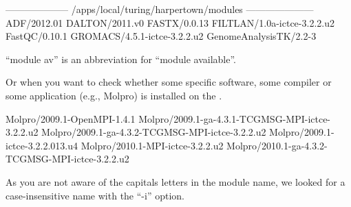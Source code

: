 \begin{prompt}
-------------------- /apps/local/turing/harpertown/modules ---------------------
ADF/2012.01
DALTON/2011.v0
FASTX/0.0.13
FILTLAN/1.0a-ictce-3.2.2.u2
FastQC/0.10.1
GROMACS/4.5.1-ictce-3.2.2.u2
GenomeAnalysisTK/2.2-3
\end{prompt}

``module av'' is an abbreviation for ``module available''.

Or when you want to check whether some specific software, some compiler or some
application (e.g., Molpro) is installed on the \hpc.

\begin{prompt}
Molpro/2009.1-OpenMPI-1.4.1
Molpro/2009.1-ga-4.3.1-TCGMSG-MPI-ictce-3.2.2.u2
Molpro/2009.1-ga-4.3.2-TCGMSG-MPI-ictce-3.2.2.u2
Molpro/2009.1-ictce-3.2.2.013.u4
Molpro/2010.1-MPI-ictce-3.2.2.u2
Molpro/2010.1-ga-4.3.2-TCGMSG-MPI-ictce-3.2.2.u2
\end{prompt}

As you are not aware of the capitals letters in the module name, we looked for
a case-insensitive name with the ``-i'' option.
